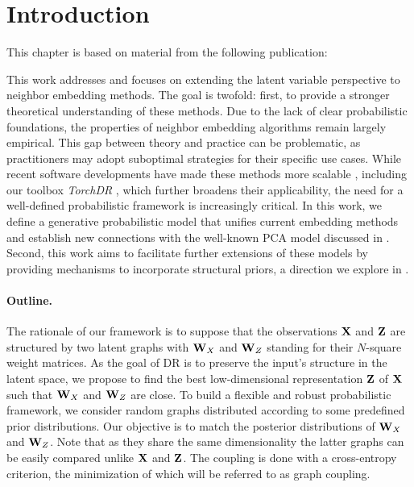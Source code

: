 \section{Introduction}\label{intro}


This chapter is based on material from the following publication:

\begin{mdframed}
\begin{center} 
\end{center}
\end{mdframed}


This work addresses  and focuses on extending the latent variable perspective to neighbor embedding methods. The goal is twofold: first, to provide a stronger theoretical understanding of these methods. Due to the lack of clear probabilistic foundations, the properties of neighbor embedding algorithms remain largely empirical. This gap between theory and practice can be problematic, as practitioners may adopt suboptimal strategies for their specific use cases.  
While recent software developments have made these methods more scalable \citep{chan2018t,pezzotti2019gpgpu,linderman2019fast}, including our toolbox \emph{TorchDR} \citep{vanassel2024torchdr}, which further broadens their applicability, the need for a well-defined probabilistic framework is increasingly critical.  
In this work, we define a generative probabilistic model that unifies current embedding methods and establish new connections with the well-known PCA model discussed in .  
Second, this work aims to facilitate further extensions of these models by providing mechanisms to incorporate structural priors, a direction we explore in .


\paragraph{Outline.} 
The rationale of our framework is to suppose that the observations $\mathbf{X}$ and $\mathbf{Z}$ are structured by two latent graphs with $\mathbf{W}_{X}$ and $\mathbf{W}_{Z}$ standing for their $N$-square weight matrices.
As the goal of DR is to preserve the input's structure in the latent space, we propose to find the best low-dimensional representation $\mathbf{Z}$ of $\mathbf{X}$ such that $\mathbf{W}_{X}$ and $\mathbf{W}_{Z}$ are close. To build a flexible and robust probabilistic framework, we consider random graphs distributed according to some predefined prior distributions. Our objective is to match the posterior distributions of $\mathbf{W}_{X}$ and $\mathbf{W}_{Z}$. Note that as they share the same dimensionality the latter graphs can be easily compared unlike $\mathbf{X}$ and $\mathbf{Z}$. The coupling is done with a cross-entropy criterion, the minimization of which will be referred to as graph coupling.

